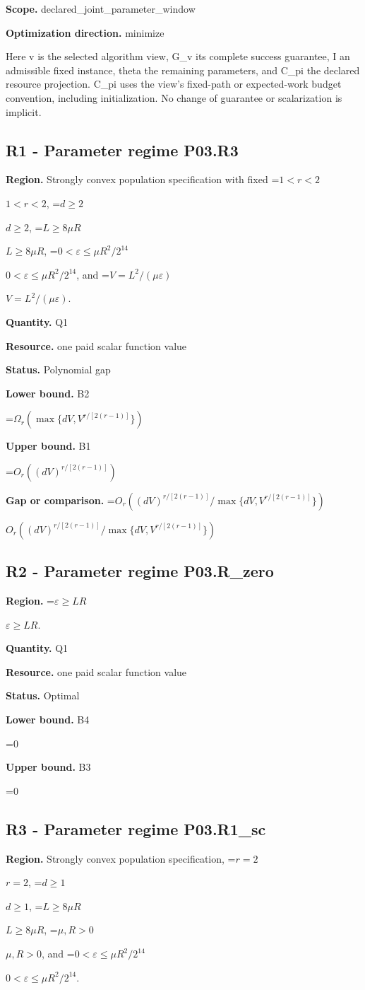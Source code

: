 \documentclass[10pt,a4paper]{article}
\newcommand{\AtlasMath}[1]{\par\begingroup\centering\setbox0=\hbox{$\displaystyle #1$}\ifdim\wd0>1.4\linewidth\typeout{ATLAS WIDE FORMULA: \the\wd0}\fi\ifdim\wd0>\linewidth\resizebox{\linewidth}{!}{\box0}\else\box0\fi\par\endgroup}
\newcommand{\AtlasInlineMath}[1]{\begingroup\setbox0=\hbox{$#1$}\ifdim\wd0>.4\linewidth\endgroup\AtlasMath{#1}\else\endgroup$#1$\fi}
\begin{document}
\textbf{Scope.} declared\_joint\_parameter\_window

\textbf{Optimization direction.} minimize

Here v is the selected algorithm view, G\_v its complete success guarantee, I an admissible fixed instance, theta the remaining parameters, and C\_pi the declared resource projection. C\_pi uses the view's fixed-path or expected-work budget convention, including initialization. No change of guarantee or scalarization is implicit.

\subsection{R1 - Parameter regime P03.R3}
\textbf{Region.} Strongly convex population specification with fixed \AtlasInlineMath{1<r<2}, \AtlasInlineMath{d\ge2}, \AtlasInlineMath{L\ge8\mu R}, \AtlasInlineMath{0<\varepsilon\le\mu R^2/2^{14}}, and \AtlasInlineMath{V=L^2/(\mu\varepsilon)}.

\textbf{Quantity.} Q1

\textbf{Resource.} one paid scalar function value

\textbf{Status.} Polynomial gap

\textbf{Lower bound.} B2

\AtlasMath{\Omega_r(\max\{dV,V^{r/[2(r-1)]}\})}
\textbf{Upper bound.} B1

\AtlasMath{O_r((dV)^{r/[2(r-1)]})}
\textbf{Gap or comparison.} \AtlasInlineMath{O_r((dV)^{r/[2(r-1)]}/\max\{dV,V^{r/[2(r-1)]}\})}

\subsection{R2 - Parameter regime P03.R\_zero}
\textbf{Region.} \AtlasInlineMath{\varepsilon\ge LR}.

\textbf{Quantity.} Q1

\textbf{Resource.} one paid scalar function value

\textbf{Status.} Optimal

\textbf{Lower bound.} B4

\AtlasMath{0}
\textbf{Upper bound.} B3

\AtlasMath{0}
\subsection{R3 - Parameter regime P03.R1\_sc}
\textbf{Region.} Strongly convex population specification, \AtlasInlineMath{r=2}, \AtlasInlineMath{d\ge1}, \AtlasInlineMath{L\ge8\mu R}, \AtlasInlineMath{\mu,R>0}, and \AtlasInlineMath{0<\varepsilon\le\mu R^2/2^{14}}.
\end{document}
